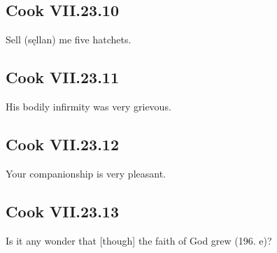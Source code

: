 \par\begin{minipage}{\linewidth}\raggedright
\subsection*{Cook VII.23.10}

Sell (sęllan) me five hatchets.

\end{minipage}\par\addvspace{4pt}

\par\begin{minipage}{\linewidth}\raggedright
\subsection*{Cook VII.23.11}

His bodily infirmity was very grievous.

\end{minipage}\par\addvspace{4pt}

\par\begin{minipage}{\linewidth}\raggedright
\subsection*{Cook VII.23.12}

Your companionship is very pleasant.

\end{minipage}\par\addvspace{4pt}

\par\begin{minipage}{\linewidth}\raggedright
\subsection*{Cook VII.23.13}

Is it any wonder that [though] the faith of God grew (196. e)?

\end{minipage}\par\addvspace{4pt}

